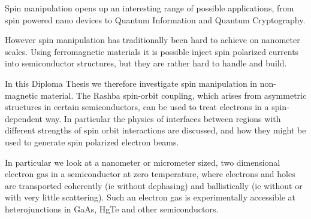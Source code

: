 Spin manipulation opens up an interesting range of possible applications, from
spin powered nano devices to Quantum Information and Quantum Cryptography.

However spin manipulation has traditionally been hard to achieve on nanometer
scales. Using ferromagnetic materials it is possible inject spin polarized
currents into semiconductor structures, but they are rather hard to handle
and build.

In this Diploma Thesis we therefore investigate spin manipulation in
non-magnetic material. The Rashba spin-orbit coupling, which arises from
asymmetric structures in certain semiconductors, can be used to treat
electrons in a spin-dependent way. In particular the physics of interfaces
between regions with different strengths of spin orbit interactions are
discussed, and how they might be used to generate spin polarized electron
beams.

In particular we look at a nanometer or micrometer sized, two dimensional
electron gas in a semiconductor at zero temperature, where electrons and holes
are transported coherently (ie without dephasing) and ballistically (ie
without or with very little scattering). Such an electron gas is
experimentally accessible at heterojunctions in GaAs, HgTe and other semiconductors.
